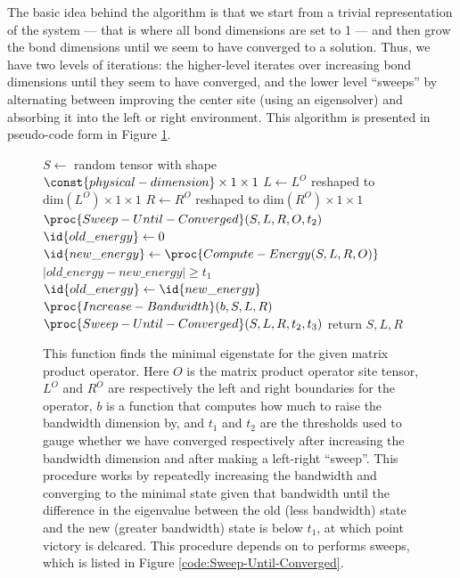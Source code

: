 \documentclass{article}
\begin{document}
The basic idea behind the algorithm is that we start from a trivial representation of the system --- that is where all bond dimensions are set to 1 --- and then grow the bond dimensions until we seem to have converged to a solution.  Thus, we have two levels of iterations:  the higher-level iterates over increasing bond dimensions until they seem to have converged, and the lower level ``sweeps'' by alternating between improving the center site (using an eigensolver) and absorbing it into the left or right environment.  This algorithm is presented in pseudo-code form in Figure \ref{code:Compute-Ground-State}.

\begin{figure}
\begin{codebox}
\li $S \gets$ random tensor with shape $\const{physical-dimension}\times1\times 1$
\li $L \gets L^O$ reshaped to $\text{dim}(L^O)\times1\times1$
\li $R \gets R^O$ reshaped to $\text{dim}(R^O)\times1\times1$
\li $\proc{Sweep-Until-Converged}(S,L,R,O,t_2)$
\li $\id{old\_energy} \gets 0$
\li $\id{new\_energy} \gets  \proc{Compute-Energy(S,L,R,O)}$
\li \While $|old\_energy-new\_energy| \ge t_1$
\li     \Do
\li         $\id{old\_energy} \gets \id{new\_energy}$
\li         $\proc{Increase-Bandwidth}(b,S,L,R)$
\li         $\proc{Sweep-Until-Converged}(S,L,R,t_2,t_3)$
\End
\li return $S,L,R$
\end{codebox}
\caption{\label{code:Compute-Ground-State} This function finds the minimal eigenstate for the given matrix product operator.  Here $O$ is the matrix product operator site tensor, $L^O$ and $R^O$ are respectively the left and right boundaries for the operator, $b$ is a function that computes how much to raise the bandwidth dimension by, and $t_1$ and $t_2$ are the thresholds used to gauge whether we have converged respectively after increasing the bandwidth dimension and after making a left-right ``sweep''.  This procedure works by repeatedly increasing the bandwidth and converging to the minimal state given that bandwidth until the difference in the eigenvalue between the old (less bandwidth) state and the new (greater bandwidth) state is below $t_1$, at which point victory is delcared. This procedure depends on  to performs sweeps, which is listed in Figure \ref{code:Sweep-Until-Converged}.}
\end{figure}
\end{document}
